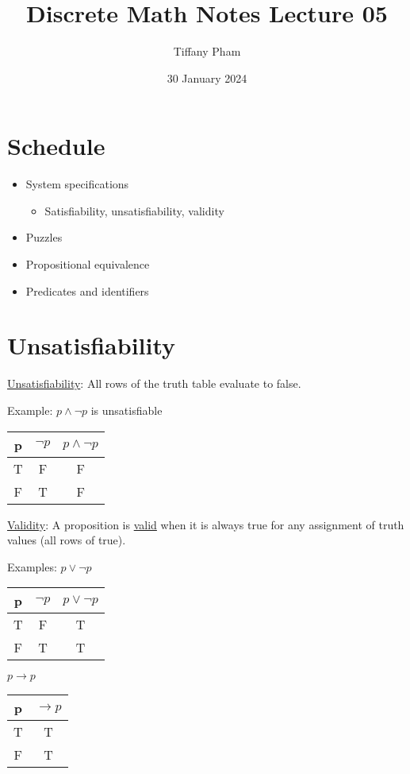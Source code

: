 \documentclass{article}
\title{Discrete Math Notes Lecture 05}
\author{Tiffany Pham}
\date{30 January 2024}
\begin{document}
\maketitle

\section{Schedule}
\begin{itemize}
    \item System specifications
    \begin{itemize}
        \item Satisfiability, unsatisfiability, validity
    \end{itemize}
    \item Puzzles
    \item Propositional equivalence
    \item Predicates and identifiers
\end{itemize}

\section{Unsatisfiability}
\underline{Unsatisfiability}: All rows of the truth table evaluate to false.

\hfill \break
Example: $p\land \lnot p$ is unsatisfiable
\begin{center}
\begin{tabular}{ |c|c|c| } 
 \hline
 p & $\lnot p$ & $p\land \lnot p$ \\ 
 \hline
 T & F & F \\ 
 F & T & F \\
 \hline
\end{tabular}
\end{center}

\hfill \break
\underline{Validity}: A proposition is \underline{valid} when it is always true for any assignment of truth values (all rows of true).

\hfill \break
Examples: $p\lor \lnot p$
\begin{center}
\begin{tabular}{ |c|c|c| } 
 \hline
 p & $\lnot p$ & $p\lor \lnot p$ \\ 
 \hline
 T & F & T \\ 
 F & T & T \\
 \hline
\end{tabular}
\end{center}

\hfill \break
$p\rightarrow p$
\begin{center}
\begin{tabular}{ |c|c| } 
 \hline
 p & $\rightarrow p$ \\
 \hline
 T & T \\ 
 F & T \\
 \hline
\end{tabular}
\end{center}
\end{document}
